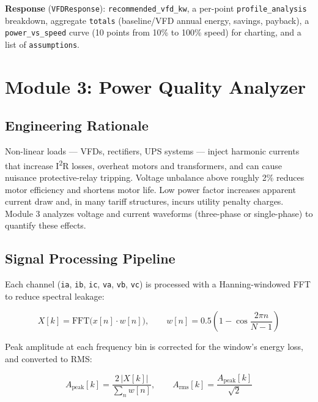 \documentclass[11pt,a4paper]{article}
\newcommand{\code}[1]{\texttt{#1}}
\begin{document}
\textbf{Response} (\code{VFDResponse}): \code{recommended\_vfd\_kw}, a
per-point \code{profile\_analysis} breakdown, aggregate \code{totals}
(baseline/VFD annual energy, savings, payback), a \code{power\_vs\_speed}
curve (10 points from 10\% to 100\% speed) for charting, and a list of
\code{assumptions}.

\section{Module 3: Power Quality Analyzer}
\label{sec:module3}

\subsection{Engineering Rationale}

Non-linear loads --- VFDs, rectifiers, UPS systems --- inject harmonic
currents that increase I\textsuperscript{2}R losses, overheat motors and
transformers, and can cause nuisance protective-relay tripping. Voltage
unbalance above roughly 2\% reduces motor efficiency and shortens motor
life. Low power factor increases apparent current draw and, in many
tariff structures, incurs utility penalty charges. Module 3 analyzes
voltage and current waveforms (three-phase or single-phase) to quantify
these effects.

\subsection{Signal Processing Pipeline}

Each channel (\code{ia}, \code{ib}, \code{ic}, \code{va}, \code{vb},
\code{vc}) is processed with a Hanning-windowed FFT to reduce spectral
leakage:

\begin{equation}
X[k] = \mathrm{FFT}\big(x[n] \cdot w[n]\big), \qquad
w[n] = 0.5\left(1 - \cos\!\frac{2\pi n}{N-1}\right)
\end{equation}

Peak amplitude at each frequency bin is corrected for the window's energy
loss, and converted to RMS:

\begin{equation}
A_{\mathrm{peak}}[k] = \frac{2\,|X[k]|}{\sum_n w[n]}, \qquad
A_{\mathrm{rms}}[k] = \frac{A_{\mathrm{peak}}[k]}{\sqrt{2}}
\end{equation}
\end{document}
